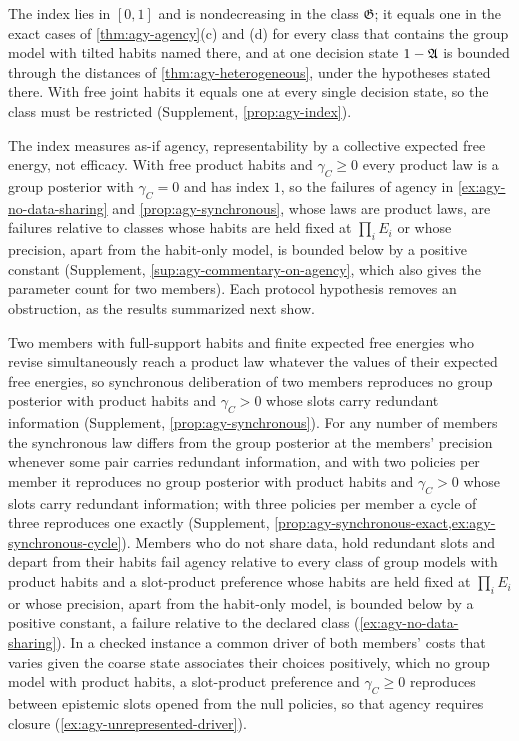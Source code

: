 The index lies in $[0,1]$ and is nondecreasing in the class $\mathfrak G$; it equals one in the exact cases of \cref{thm:agy-agency}(c) and (d) for every class that contains the group model with tilted habits named there, and at one decision state $1-\mathfrak{A}$ is bounded through the distances of \cref{thm:agy-heterogeneous}, under the hypotheses stated there. With free joint habits it equals one at every single decision state, so the class must be restricted (Supplement, \cref{prop:agy-index}).

The index measures as-if agency, representability by a collective expected free energy, not efficacy. With free product habits and $\gamma_C\ge0$ every product law is a group posterior with $\gamma_C=0$ and has index $1$, so the failures of agency in \cref{ex:agy-no-data-sharing} and \cref{prop:agy-synchronous}, whose laws are product laws, are failures relative to classes whose habits are held fixed at $\prod_iE_i$ or whose precision, apart from the habit-only model, is bounded below by a positive constant (Supplement, \cref{sup:agy-commentary-on-agency}, which also gives the parameter count for two members). Each protocol hypothesis removes an obstruction, as the results summarized next show.

Two members with full-support habits and finite expected free energies who revise simultaneously reach a product law whatever the values of their expected free energies, so synchronous deliberation of two members reproduces no group posterior with product habits and $\gamma_C>0$ whose slots carry redundant information (Supplement, \cref{prop:agy-synchronous}). For any number of members the synchronous law differs from the group posterior at the members' precision whenever some pair carries redundant information, and with two policies per member it reproduces no group posterior with product habits and $\gamma_C>0$ whose slots carry redundant information; with three policies per member a cycle of three reproduces one exactly (Supplement, \cref{prop:agy-synchronous-exact,ex:agy-synchronous-cycle}). Members who do not share data, hold redundant slots and depart from their habits fail agency relative to every class of group models with product habits and a slot-product preference whose habits are held fixed at $\prod_iE_i$ or whose precision, apart from the habit-only model, is bounded below by a positive constant, a failure relative to the declared class (\cref{ex:agy-no-data-sharing}). In a checked instance a common driver of both members' costs that varies given the coarse state associates their choices positively, which no group model with product habits, a slot-product preference and $\gamma_C\ge0$ reproduces between epistemic slots opened from the null policies, so that agency requires closure (\cref{ex:agy-unrepresented-driver}).

